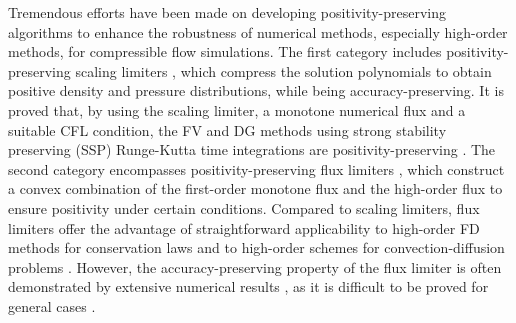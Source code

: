 Tremendous efforts have been made on developing positivity-preserving algorithms to enhance the robustness of numerical methods,
especially high-order methods, for compressible flow simulations.
The first category includes positivity-preserving scaling limiters \cite{zhang2010maximum,zhang2010positivity,wang2012robust,cheng2014positivity,du2022high},
which compress the solution polynomials to obtain positive density and pressure distributions,
while being accuracy-preserving.
It is proved that, by using the scaling limiter,
a monotone numerical flux and a suitable CFL condition,
the FV and DG methods using strong stability preserving (SSP) Runge-Kutta
time integrations are positivity-preserving \cite{zhang2010positivity}.
The second category encompasses positivity-preserving flux limiters \cite{hu2013positivity,christlieb2015high,kuzmin2022bound},
which construct a convex combination of the first-order monotone flux and the high-order flux to ensure positivity under certain conditions. Compared to scaling limiters,
flux limiters offer the advantage of straightforward applicability to high-order FD methods for conservation laws and to high-order schemes
for convection-diffusion problems \cite{xu2017bound}.
However, the accuracy-preserving property of the flux limiter is often demonstrated
by extensive numerical results \cite{xiong2013parametrized},
as it is difficult to be proved for general cases \cite{xu2017bound}.
